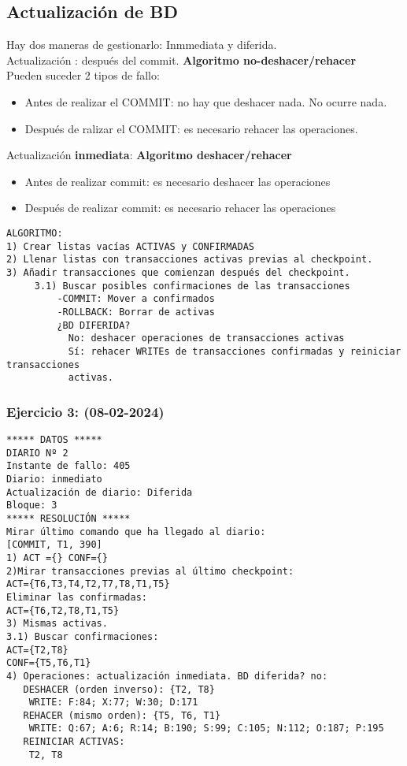 \documentclass{article}
\begin{document}
\subsection{Actualización de BD}
Hay dos maneras de gestionarlo: Inmmediata y diferida.\\
Actualización : después del commit. \textbf{Algoritmo no-deshacer/rehacer}\\
Pueden suceder 2 tipos de fallo:
\begin{itemize}
	\item Antes de realizar el COMMIT: no hay que deshacer nada. No ocurre nada.
	\item Después de ralizar el COMMIT: es necesario rehacer las operaciones.
\end{itemize}
Actualización \textbf{inmediata}:  \textbf{Algoritmo deshacer/rehacer}
\begin{itemize}
	\item Antes de realizar commit: es necesario deshacer las operaciones
	\item Después de realizar commit: es necesario rehacer las operaciones
\end{itemize}
\begin{verbatim}
ALGORITMO:
1) Crear listas vacías ACTIVAS y CONFIRMADAS
2) Llenar listas con transacciones activas previas al checkpoint. 
3) Añadir transacciones que comienzan después del checkpoint.
     3.1) Buscar posibles confirmaciones de las transacciones
         -COMMIT: Mover a confirmados
         -ROLLBACK: Borrar de activas
         ¿BD DIFERIDA?
           No: deshacer operaciones de transacciones activas
           Sí: rehacer WRITEs de transacciones confirmadas y reiniciar transacciones
           activas.
\end{verbatim}

\subsubsection{Ejercicio 3: (08-02-2024)}
\begin{verbatim}
***** DATOS *****
DIARIO Nº 2
Instante de fallo: 405
Diario: inmediato
Actualización de diario: Diferida
Bloque: 3
***** RESOLUCIÓN *****
Mirar último comando que ha llegado al diario:
[COMMIT, T1, 390]
1) ACT ={} CONF={}
2)Mirar transacciones previas al último checkpoint:
ACT={T6,T3,T4,T2,T7,T8,T1,T5}
Eliminar las confirmadas:
ACT={T6,T2,T8,T1,T5}
3) Mismas activas.
3.1) Buscar confirmaciones: 
ACT={T2,T8}
CONF={T5,T6,T1}
4) Operaciones: actualización inmediata. BD diferida? no:
   DESHACER (orden inverso): {T2, T8}
    WRITE: F:84; X:77; W:30; D:171
   REHACER (mismo orden): {T5, T6, T1}
    WRITE: Q:67; A:6; R:14; B:190; S:99; C:105; N:112; O:187; P:195
   REINICIAR ACTIVAS:
    T2, T8
\end{verbatim}
\end{document}
